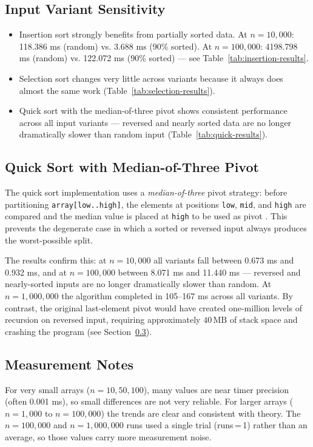 \documentclass[11pt,a4paper]{article}
\begin{document}
\subsection{Input Variant Sensitivity}
\begin{itemize}
    \item Insertion sort strongly benefits from partially sorted data. At \(n=10{,}000\): 118.386 ms (random) vs. 3.688 ms (90\% sorted). At \(n=100{,}000\): 4198.798 ms (random) vs. 122.072 ms (90\% sorted) --- see Table~\ref{tab:insertion-results}.
    \item Selection sort changes very little across variants because it always does almost the same work (Table~\ref{tab:selection-results}).
    \item Quick sort with the median-of-three pivot shows consistent performance across all input variants --- reversed and nearly sorted data are no longer dramatically slower than random input (Table~\ref{tab:quick-results}).
\end{itemize}

\subsection{Quick Sort with Median-of-Three Pivot}
The quick sort implementation uses a \emph{median-of-three} pivot strategy: before partitioning \texttt{array[low..high]}, the elements at positions \texttt{low}, \texttt{mid}, and \texttt{high} are compared and the median value is placed at \texttt{high} to be used as pivot \cite{gfg_quicksort}. This prevents the degenerate case in which a sorted or reversed input always produces the worst-possible split.

The results confirm this: at \(n=10{,}000\) all variants fall between 0.673 ms and 0.932 ms, and at \(n=100{,}000\) between 8.071 ms and 11.440 ms --- reversed and nearly-sorted inputs are no longer dramatically slower than random. At \(n=1{,}000{,}000\) the algorithm completed in 105--167 ms across all variants. By contrast, the original last-element pivot would have created one-million levels of recursion on reversed input, requiring approximately \(40\,\text{MB}\) of stack space and crashing the program (see Section~\ref{sec:notes}).

\subsection{Measurement Notes}\label{sec:notes}
For very small arrays (\(n=10,50,100\)), many values are near timer precision (often 0.001 ms), so small differences are not very reliable. For larger arrays (\(n=1{,}000\) to \(n=100{,}000\)) the trends are clear and consistent with theory. The \(n=100{,}000\) and \(n=1{,}000{,}000\) runs used a single trial (runs\,=\,1) rather than an average, so those values carry more measurement noise.
\end{document}
